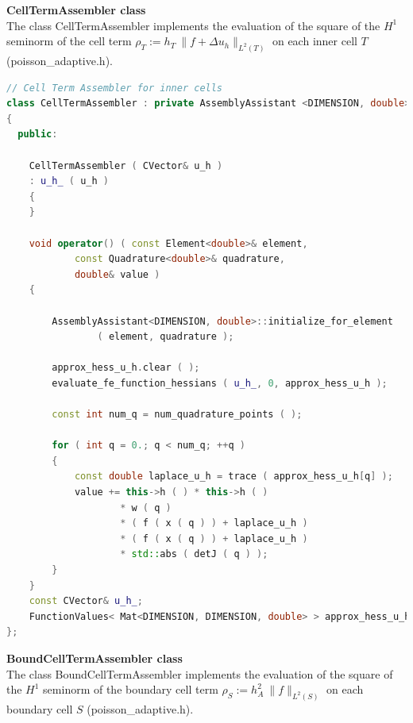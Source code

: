 \documentclass[a4paper, 11pt, twoside]{article}
\begin{document}
\textbf{CellTermAssembler class}\\
The class CellTermAssembler implements the evaluation of the square of the $H^1$ seminorm of the cell term $\rho_{T}:=h_T\ \| f + \Delta u_h\|_{L^2(T)}$ on each inner cell $T$ (poisson\_adaptive.h).

\begin{lstlisting}[language=C++, basicstyle={\footnotesize, \ttfamily}, keywordstyle=\color{blue}, numbers=none, tabsize=4]
// Cell Term Assembler for inner cells
class CellTermAssembler : private AssemblyAssistant <DIMENSION, double>
{
  public:

    CellTermAssembler ( CVector& u_h )
    : u_h_ ( u_h )
    {
    }

    void operator() ( const Element<double>& element,
            const Quadrature<double>& quadrature,
            double& value )
    {

        AssemblyAssistant<DIMENSION, double>::initialize_for_element
                ( element, quadrature );

        approx_hess_u_h.clear ( );
        evaluate_fe_function_hessians ( u_h_, 0, approx_hess_u_h );

        const int num_q = num_quadrature_points ( );

        for ( int q = 0.; q < num_q; ++q )
        {
            const double laplace_u_h = trace ( approx_hess_u_h[q] );
            value += this->h ( ) * this->h ( )
                    * w ( q )
                    * ( f ( x ( q ) ) + laplace_u_h )
                    * ( f ( x ( q ) ) + laplace_u_h )
                    * std::abs ( detJ ( q ) );
        }
    }
    const CVector& u_h_;
    FunctionValues< Mat<DIMENSION, DIMENSION, double> > approx_hess_u_h;
};
\end{lstlisting}

\textbf{BoundCellTermAssembler class}\\
The class BoundCellTermAssembler implements the evaluation of the square of the $H^1$ seminorm of the boundary cell term 
$\rho_{S} := h_A^2\ \|f\|_{L^2(S)}$ on each boundary cell $S$ (poisson\_adaptive.h).
\end{document}
